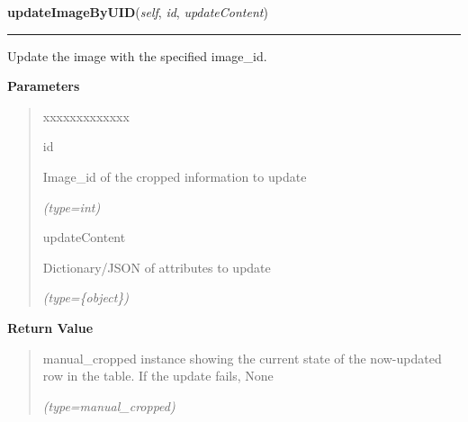     \label{src:dao:manual_cropped_dao:ManualCroppedDAO:updateImageByUID}

    \vspace{0.5ex}

\hspace{.8\funcindent}\begin{boxedminipage}{\funcwidth}

    \raggedright \textbf{updateImageByUID}(\textit{self}, \textit{id}, \textit{updateContent})

    \vspace{-1.5ex}

    \rule{\textwidth}{0.5\fboxrule}
\setlength{\parskip}{2ex}
    Update the image with the specified image\_id.

\setlength{\parskip}{1ex}
      \textbf{Parameters}
      \vspace{-1ex}

      \begin{quote}
        \begin{Ventry}{xxxxxxxxxxxxx}

          \item[id]

          Image\_id of the cropped information to update

            {\it (type=int)}

          \item[updateContent]

          Dictionary/JSON of attributes to update

            {\it (type=\{object\})}

        \end{Ventry}

      \end{quote}

      \textbf{Return Value}
    \vspace{-1ex}

      \begin{quote}
      manual\_cropped instance showing the current state of the now-updated
      row in the table. If the update fails, None

      {\it (type=manual\_cropped)}

      \end{quote}

    \end{boxedminipage}


